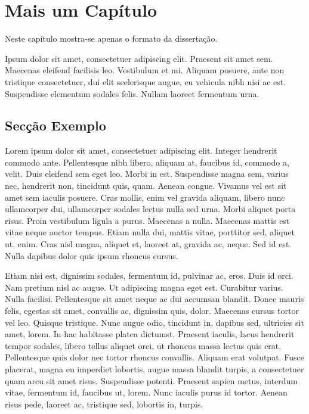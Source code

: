 \chapter{Mais um Capítulo}\label{chap:chap4}

Neste capítulo mostra-se apenas o formato da dissertação.

Ipsum dolor sit amet, consectetuer
adipiscing elit.  Praesent sit amet sem. 
Maecenas eleifend facilisis leo. Vestibulum et
mi. Aliquam posuere, ante non tristique consectetuer, dui elit
scelerisque augue, eu vehicula nibh nisi ac est. 
Suspendisse elementum sodales felis. 
Nullam laoreet fermentum urna. 

\section{Secção Exemplo}

Lorem ipsum dolor sit amet, consectetuer adipiscing elit. Integer
hendrerit commodo ante. Pellentesque nibh libero, aliquam at, faucibus
id, commodo a, velit. Duis eleifend sem eget leo. Morbi in
est. Suspendisse magna sem, varius nec, hendrerit non, tincidunt quis,
quam. Aenean congue. Vivamus vel est sit amet sem iaculis
posuere. Cras mollis, enim vel gravida aliquam, libero nunc
ullamcorper dui, ullamcorper sodales lectus nulla sed urna. Morbi
aliquet porta risus. Proin vestibulum ligula a purus. Maecenas a
nulla. Maecenas mattis est vitae neque auctor tempus. Etiam nulla dui,
mattis vitae, porttitor sed, aliquet ut, enim. Cras nisl magna,
aliquet et, laoreet at, gravida ac, neque. Sed id est. Nulla dapibus
dolor quis ipsum rhoncus cursus. 

Etiam nisi est, dignissim sodales, fermentum id, pulvinar ac,
eros. Duis id orci. Nam pretium nisl ac augue. Ut adipiscing magna
eget est. Curabitur varius. Nulla facilisi. Pellentesque sit amet
neque ac dui accumsan blandit. Donec mauris felis, egestas sit amet,
convallis ac, dignissim quis, dolor. Maecenas cursus tortor vel
leo. Quisque tristique. Nunc augue odio, tincidunt in, dapibus sed,
ultricies sit amet, lorem. In hac habitasse platea dictumst. Praesent
iaculis, lacus hendrerit tempor sodales, libero tellus aliquet orci,
ut rhoncus massa lectus quis erat. Pellentesque quis dolor nec tortor
rhoncus convallis. Aliquam erat volutpat. Fusce placerat, magna eu
imperdiet lobortis, augue massa blandit turpis, a consectetuer quam
arcu sit amet risus. Suspendisse potenti. Praesent sapien metus,
interdum vitae, fermentum id, faucibus ut, lorem. Nunc iaculis purus
id tortor. Aenean risus pede, laoreet ac, tristique sed, lobortis in,
turpis. 

